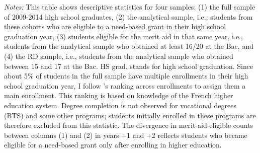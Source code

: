 \begin{table}[!ht]
{\begin{threeparttable}
\begin{tablenotes}[para]
\item \textit{Notes:} This table shows descriptive statistics for four samples: (1) the full sample of 2009-2014 high school graduates, (2) the analytical sample, i.e., students from these cohorts who are eligible to a need-based grant in their high school graduation year, (3) students eligible for the merit aid in that same year, i.e., students from the analytical sample who obtained at least 16/20 at the Bac, and (4) the RD sample, i.e., students from the analytical sample who obtained between 15 and 17 at the Bac. HS grad. stands for high school graduation. Since about 5\% of students in the full sample have multiple enrollments in their high school graduation year, I follow \citet{bonneau_quelle_2021}'s ranking across enrollments to assign them a main enrollment. This ranking is based on knowledge of the French higher education system. Degree completion is not observed for vocational degrees (BTS) and some other programs; students initially enrolled in these programs are therefore excluded from this statistic. The divergence in merit-aid-eligible counts between columns (1) and (2) in years +1 and +2 reflects students who became eligible for a need-based grant only after enrolling in higher education.
\end{tablenotes}
\end{threeparttable}}
\end{table}

